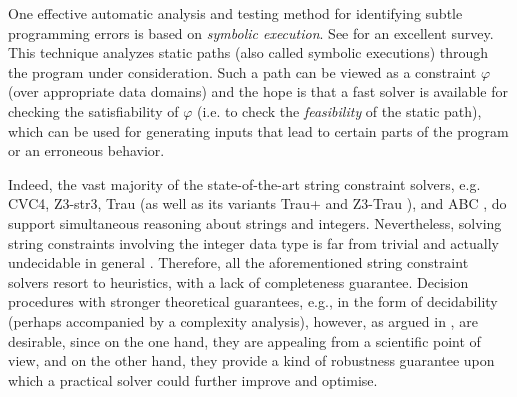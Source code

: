 One effective
automatic analysis and testing method for identifying subtle programming errors is based on \emph{symbolic execution}.
See \cite{symbex-survey} for an excellent survey. 
This technique analyzes static paths
(also called symbolic executions) through the program under consideration. %
Such a path can be viewed as a constraint $\varphi$ (over
appropriate data domains) and the hope is that a fast
solver is available for checking the satisfiability of $\varphi$ (i.e. to check
the \emph{feasibility} of the static path), which can be used for generating
inputs that lead to certain parts of the program or an erroneous behavior.






Indeed, the vast majority of the state-of-the-art string constraint solvers, e.g. CVC4\cite{cvc4}, Z3-str3\cite{Z3-str3}, Trau \cite{Abdulla17} (as well as its variants Trau+ \cite{AbdullaA+19} and Z3-Trau \cite{Z3-trau}),  and ABC \cite{ABC}, do support simultaneous reasoning about strings and integers. 
Nevertheless, solving string constraints involving the integer data type is far from trivial and actually undecidable in general \cite{buchi,CCH+18}. Therefore, all the aforementioned string constraint solvers resort to heuristics, with a lack of completeness guarantee. Decision procedures with stronger theoretical guarantees, e.g., in the form of decidability (perhaps accompanied by a complexity analysis), however, as argued in \cite{CHL+19}, are desirable, since on the one hand, they are appealing from a scientific point of view, and on the other hand, they provide a kind of robustness guarantee upon which a practical solver could further improve and optimise.

